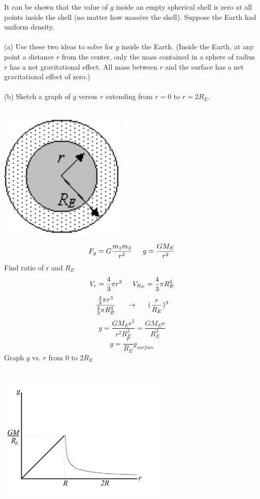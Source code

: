 \documentclass{article}
\begin{document}
        \begin{multicols}{2}
        	It can be shown that the value of $g$ inside an empty spherical shell is zero at all points inside the shell (no matter how massive the shell).  Suppose the Earth had uniform density.\\\\ (a) Use these two ideas to solve for $g$ inside the Earth. (Inside the Earth, at any point a distance $r$ from the center, only the mass contained in a sphere of radius $r$ has a net gravitational effect.  All mass between $r$ and the surface has a net gravitational effect of zero.)\\\\ (b) Sketch a graph of $g$ versus $r$ extending from $r = 0$ to $r = 2R_E$.\\\\            \centerline{\includegraphics[width=6cm]{p27.png}}
            \vfill
		\columnbreak
            \[
            	F_g=G\frac{m_1m_2}{r^2} \indent
                g=\frac{GM_E}{r^2}
            \]
            Find ratio of r and $R_E$
            \[
            	V_r=\frac{4}{3}\pi r^3 \indent
                V_{R_E}=\frac{4}{3}\pi R_E^3
            \]
            \[
            	\frac
                {\frac{4}{3}\pi r^3}
                {\frac{4}{3}\pi R_E^3}
                \indent
                \rightarrow
                \indent
                (\frac{r}{R_E})^3
            \]
            \[
            	g=\frac{GM_Er^3}{r^2R_E^3}=\frac{GM_Er}{R_E^3}
            \]
            \[
            	g=\frac{r}{R_E}g_{surface}
            \]
            Graph $g$ vs. $r$ from $0$ to $2R_E$\\\\
            \centerline{\includegraphics[width=8cm]{graph27.png}}
        \end{multicols}
        
\end{document}
